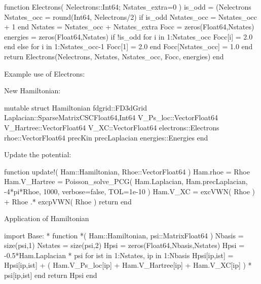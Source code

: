 \begin{juliacode}
function Electrons( Nelectrons::Int64; Nstates_extra=0 )
  is_odd = (Nelectrons%
  Nstates_occ = round(Int64, Nelectrons/2)
  if is_odd
      Nstates_occ = Nstates_occ + 1
  end
  Nstates = Nstates_occ + Nstates_extra
  Focc = zeros(Float64,Nstates)
  energies = zeros(Float64,Nstates)
  if !is_odd
    for i in 1:Nstates_occ
      Focc[i] = 2.0 
    end
  else
    for i in 1:Nstates_occ-1
      Focc[1] = 2.0
    end
    Focc[Nstates_occ] = 1.0
  end
  return Electrons(Nelectrons, Nstates, Nstates_occ, Focc, energies)
end
\end{juliacode}

Example use of Electrons:

New Hamiltonian:
\begin{juliacode}
mutable struct Hamiltonian
  fdgrid::FD3dGrid
  Laplacian::SparseMatrixCSC{Float64,Int64}
  V_Ps_loc::Vector{Float64}
  V_Hartree::Vector{Float64}
  V_XC::Vector{Float64}
  electrons::Electrons
  rhoe::Vector{Float64}
  precKin
  precLaplacian
  energies::Energies
end
\end{juliacode}


Update the potential:

\begin{juliacode}
function update!( Ham::Hamiltonian, Rhoe::Vector{Float64} )
  Ham.rhoe = Rhoe
  Ham.V_Hartree = Poisson_solve_PCG( Ham.Laplacian, Ham.precLaplacian,
    -4*pi*Rhoe, 1000, verbose=false, TOL=1e-10 )
  Ham.V_XC = excVWN( Rhoe ) + Rhoe .* excpVWN( Rhoe )
  return
end
\end{juliacode}

Application of Hamiltonian

\begin{juliacode}
import Base: *
function *( Ham::Hamiltonian, psi::Matrix{Float64} )
  Nbasis = size(psi,1)
  Nstates = size(psi,2)
  Hpsi = zeros(Float64,Nbasis,Nstates)
  Hpsi = -0.5*Ham.Laplacian * psi
  for ist in 1:Nstates, ip in 1:Nbasis
    Hpsi[ip,ist] = Hpsi[ip,ist] + ( Ham.V_Ps_loc[ip] + Ham.V_Hartree[ip] +
                   Ham.V_XC[ip] ) * psi[ip,ist]
  end
  return Hpsi
end
\end{juliacode}